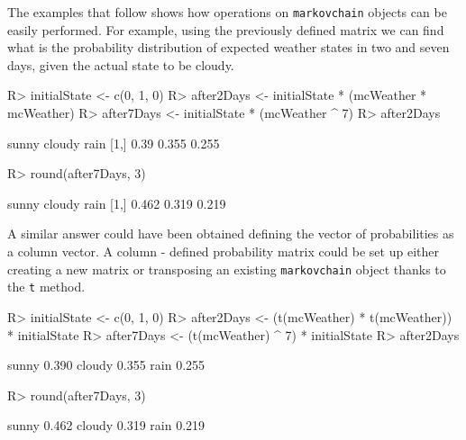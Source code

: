 \documentclass[article,nojss]{jss}
\begin{document}
The examples that follow shows how operations on \texttt{markovchain} objects can be easily performed. For example, using the previously defined matrix we can find what is the probability distribution of expected weather states in two and seven days, given the actual state to be cloudy.

\begin{CodeChunk}

\begin{CodeInput}
R> initialState <- c(0, 1, 0)
R> after2Days <- initialState * (mcWeather * mcWeather)
R> after7Days <- initialState * (mcWeather ^ 7)
R> after2Days
\end{CodeInput}

\begin{CodeOutput}
     sunny cloudy  rain
[1,]  0.39  0.355 0.255
\end{CodeOutput}

\begin{CodeInput}
R> round(after7Days, 3)
\end{CodeInput}

\begin{CodeOutput}
     sunny cloudy  rain
[1,] 0.462  0.319 0.219
\end{CodeOutput}
\end{CodeChunk}

A similar answer could have been obtained defining the vector of probabilities as a column vector. A column - defined probability matrix could be set up either creating a new matrix or transposing an existing \texttt{markovchain} object thanks to the \texttt{t} method.

\begin{CodeChunk}

\begin{CodeInput}
R> initialState <- c(0, 1, 0)
R> after2Days <- (t(mcWeather) * t(mcWeather)) * initialState
R> after7Days <- (t(mcWeather) ^ 7) * initialState
R> after2Days
\end{CodeInput}

\begin{CodeOutput}
        [,1]
sunny  0.390
cloudy 0.355
rain   0.255
\end{CodeOutput}

\begin{CodeInput}
R> round(after7Days, 3)
\end{CodeInput}

\begin{CodeOutput}
        [,1]
sunny  0.462
cloudy 0.319
rain   0.219
\end{CodeOutput}
\end{CodeChunk}
\end{document}
